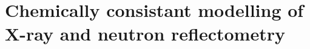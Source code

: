 
\chapter{Chemically consistant modelling of X-ray and neutron reflectometry} %

\label{reflectometry1} %


%
%
%
%

